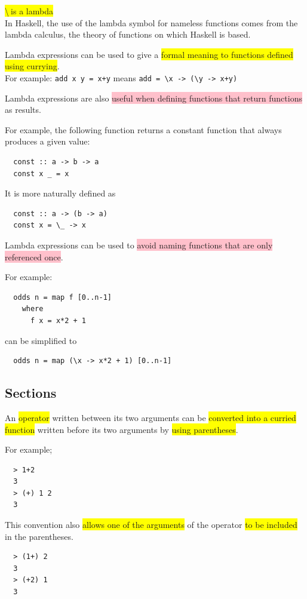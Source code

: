 \documentclass[tikz,border=10pt]{project_plan}
\begin{document}
\colorbox{yellow}{\textbackslash$\ $is a lambda}\\
In Haskell, the use of the lambda symbol for nameless functions comes
from the lambda calculus, the theory of functions on which Haskell is
based.

Lambda expressions can be used to give a \colorbox{yellow}{formal meaning
  to functions defined using currying}.\\
For example: \lstinline{add x y = x+y} means \lstinline{add = \x -> (\y -> x+y)}

Lambda expressions are also \colorbox{pink}{useful when defining
  functions that return functions} as results.

For example, the following function returns a constant
function that always produces a given value:
\begin{lstlisting}
  const :: a -> b -> a
  const x _ = x
\end{lstlisting}
It is more naturally defined as
\begin{lstlisting}
  const :: a -> (b -> a)
  const x = \_ -> x
\end{lstlisting}

Lambda expressions can be used to \colorbox{pink}{avoid naming
  functions that are only referenced once}.

For example:
\begin{lstlisting}
  odds n = map f [0..n-1]
    where
      f x = x*2 + 1
\end{lstlisting}
can be simplified to
\begin{lstlisting}
  odds n = map (\x -> x*2 + 1) [0..n-1]
\end{lstlisting}

\subsection{Sections}

An \colorbox{yellow}{operator} written between its two arguments can be
\colorbox{yellow}{converted into a curried function} written before its two
arguments by \colorbox{yellow}{using parentheses}.

For example;
\begin{lstlisting}
  > 1+2
  3
  > (+) 1 2
  3
\end{lstlisting}

This convention also \colorbox{yellow}{allows one of the arguments} of the
operator \colorbox{yellow}{to be included} in the parentheses.
\begin{lstlisting}
  > (1+) 2
  3
  > (+2) 1
  3
\end{lstlisting}
\end{document}
